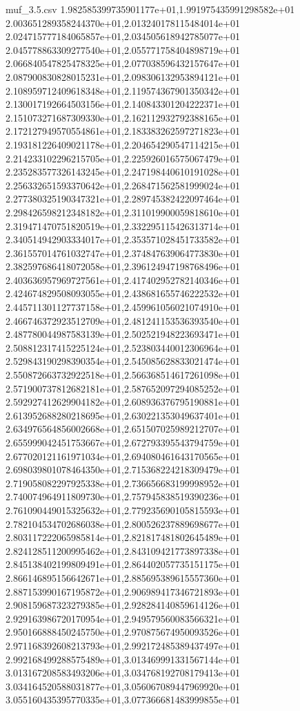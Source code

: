 \begin{filecontents*}{muf_3.5.csv}
1.982585399735901177e+01,1.991975435991298582e+01
2.003651289358244370e+01,2.013240178115484014e+01
2.024715777184065857e+01,2.034505618942785077e+01
2.045778863309277540e+01,2.055771758404898719e+01
2.066840547825478325e+01,2.077038596432157647e+01
2.087900830828015231e+01,2.098306132953894121e+01
2.108959712409618348e+01,2.119574367901350342e+01
2.130017192664503156e+01,2.140843301204222371e+01
2.151073271687309330e+01,2.162112932792388165e+01
2.172127949570554861e+01,2.183383262597271823e+01
2.193181226409021178e+01,2.204654290547114215e+01
2.214233102296215705e+01,2.225926016575067479e+01
2.235283577326143245e+01,2.247198440610191028e+01
2.256332651593370642e+01,2.268471562581999024e+01
2.277380325190347321e+01,2.289745382422097464e+01
2.298426598212348182e+01,2.311019900059818610e+01
2.319471470751820519e+01,2.332295115426313714e+01
2.340514942903334017e+01,2.353571028451733582e+01
2.361557014761032747e+01,2.374847639064773830e+01
2.382597686418072058e+01,2.396124947198768496e+01
2.403636957969727561e+01,2.417402952782140346e+01
2.424674829508093055e+01,2.438681655746222532e+01
2.445711301127737158e+01,2.459961056021074910e+01
2.466746372923512709e+01,2.481241153536393540e+01
2.487780044987583139e+01,2.502521948223693471e+01
2.508812317415225124e+01,2.523803440012306964e+01
2.529843190298390354e+01,2.545085628833021474e+01
2.550872663732922518e+01,2.566368514617261098e+01
2.571900737812682181e+01,2.587652097294085252e+01
2.592927412629904182e+01,2.608936376795190881e+01
2.613952688280218695e+01,2.630221353049637401e+01
2.634976564856002668e+01,2.651507025989212707e+01
2.655999042451753667e+01,2.672793395543794759e+01
2.677020121161971034e+01,2.694080461643170565e+01
2.698039801078464350e+01,2.715368224218309479e+01
2.719058082297925338e+01,2.736656683199998952e+01
2.740074964911809730e+01,2.757945838519390236e+01
2.761090449015325632e+01,2.779235690105815593e+01
2.782104534702686038e+01,2.800526237889698677e+01
2.803117222065985814e+01,2.821817481802645489e+01
2.824128511200995462e+01,2.843109421773897338e+01
2.845138402199809491e+01,2.864402057735151175e+01
2.866146895156642671e+01,2.885695389615557360e+01
2.887153990167195872e+01,2.906989417346721893e+01
2.908159687323279385e+01,2.928284140859614126e+01
2.929163986720170954e+01,2.949579560083566321e+01
2.950166888450245750e+01,2.970875674950093526e+01
2.971168392608213793e+01,2.992172485389437497e+01
2.992168499288575489e+01,3.013469991331567144e+01
3.013167208583493206e+01,3.034768192708179413e+01
3.034164520588031877e+01,3.056067089447969920e+01
3.055160435395770335e+01,3.077366681483999855e+01

\end{filecontents*}
